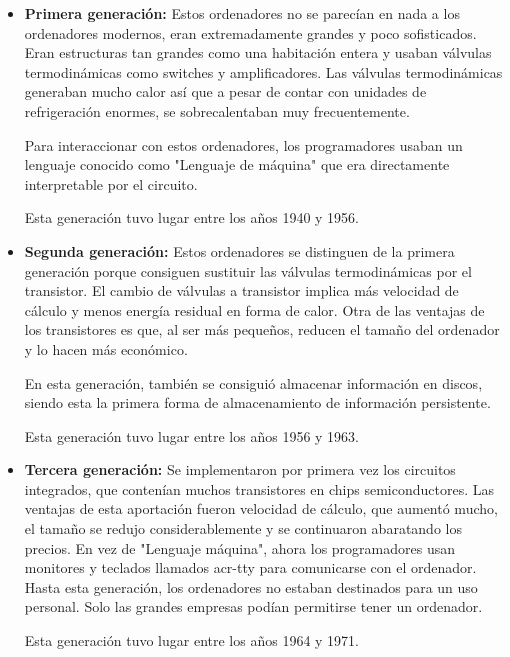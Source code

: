 \documentclass[twoside, titlepage, 12pt, a4paper]{article}
\begin{document}
\begin{itemize}
	\item{\textbf{Primera generación: }}Estos ordenadores no se parecían en nada a los ordenadores modernos, eran extremadamente grandes y poco sofisticados. Eran estructuras tan grandes como una habitación entera y usaban válvulas termodinámicas como switches y amplificadores. Las válvulas termodinámicas generaban mucho calor así que a pesar de contar con unidades de refrigeración enormes, se sobrecalentaban muy frecuentemente.\par Para interaccionar con estos ordenadores, los programadores usaban un lenguaje conocido como "Lenguaje de máquina" que era directamente interpretable por el circuito.\par Esta generación tuvo lugar entre los años 1940 y 1956.
	\item{\textbf{Segunda generación: }}Estos ordenadores se distinguen de la primera generación porque consiguen sustituir las válvulas termodinámicas por el  transistor. El cambio de válvulas a transistor implica más velocidad de cálculo y menos energía residual en forma de calor. Otra de las ventajas de los transistores es que, al ser más pequeños, reducen el tamaño del ordenador y lo hacen más económico.\par En esta generación, también se consiguió almacenar información en discos, siendo esta la primera forma de almacenamiento de información persistente.\par Esta generación tuvo lugar entre los años 1956 y 1963.
	\item{\textbf{Tercera generación: }}Se implementaron por primera vez los circuitos integrados, que contenían muchos transistores en chips semiconductores. Las ventajas de esta aportación fueron velocidad de cálculo, que aumentó mucho, el tamaño se redujo considerablemente y se continuaron abaratando los precios. En vez de "Lenguaje máquina", ahora los programadores usan monitores y teclados llamados \gls{acr-tty} para comunicarse con el ordenador. Hasta esta generación, los ordenadores no estaban destinados para un uso personal. Solo las grandes empresas podían permitirse tener un ordenador.\par Esta generación tuvo lugar entre los años 1964 y 1971.

\end{itemize}
\end{document}
